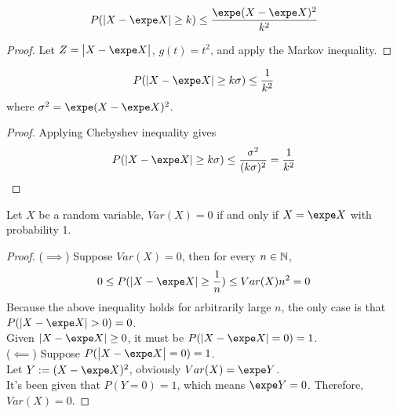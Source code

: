 \documentclass{article}
\begin{document}
   	\begin{corollary}
   		\begin{align}
   			P(|X - \expe X| \geq k) \leq \frac{\expe (X - \expe X)^2}{k^2}
   		\end{align}
   	\end{corollary}
   	
   	\begin{proof}
   		Let $Z = \abs{X - \expe X}$, $g(t) = t^2$, and apply the Markov inequality.
   	\end{proof}
   	
   	\begin{corollary}
   		\begin{align}
   			P(|X - \expe X| \geq k \sigma) \leq \frac{1}{k^2}
   		\end{align}
   		where $\sigma^2 = \expe (X - \expe X)^2$.
   	\end{corollary}
   	
   	\begin{proof}
   		Applying Chebyshev inequality gives
   		\begin{align}
   			P(|X - \expe X| \geq k \sigma) \leq \frac{\sigma^2}{(k \sigma)^2} = \frac{1}{k^2}
   		\end{align}
   	\end{proof}
   	
   	\begin{corollary}
   		Let $X$ be a random variable, $Var(X) = 0$ if and only if $X = \expe X$ with probability 1.
   	\end{corollary}
   	
   	\begin{proof}
   		($\implies$) Suppose $Var(X) = 0$, then for every $n \in \mathbb{N}$,
   		\begin{align}
   			0 \leq P(|X - \expe X| \geq \frac{1}{n}) \leq Var(X) n^2 = 0
   		\end{align}
   		Because the above inequality holds for arbitrarily large $n$, the only case is that $P(|X - \expe X| > 0) = 0$.\\
   		Given $|X - \expe X| \geq 0$, it must be $P(|X - \expe X| = 0) = 1$. \\
   		($\impliedby$) Suppose $P(\abs{X - \expe X} = 0) = 1$. \\
   		Let $Y := (X - \expe X)^2$, obviously $Var(X) = \expe Y$. \\
   		It's been given that $P(Y = 0) = 1$, which means $\expe Y = 0$. Therefore, $Var(X) = 0$.
   	\end{proof}
   	
\end{document}
